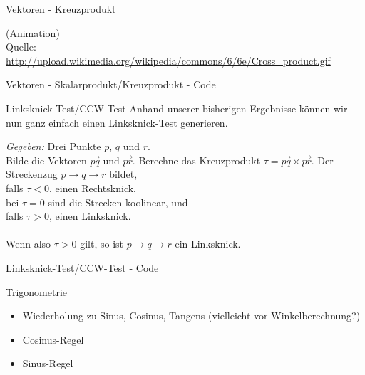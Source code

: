 \begin{frame}{Vektoren - Kreuzprodukt}
	\begin{center}
		(Animation)\\
		Quelle:\\
		\url{http://upload.wikimedia.org/wikipedia/commons/6/6e/Cross_product.gif}
	\end{center}
\end{frame}

\begin{frame}{Vektoren - Skalarprodukt/Kreuzprodukt - Code}
	\lstset{
		language=C++,
		tabsize=1
	}
	
\end{frame}

\begin{frame}{Linksknick-Test/CCW-Test}
	Anhand unserer bisherigen Ergebnisse können wir nun ganz einfach einen Linksknick-Test generieren.
	
	\begin{exampleblock}{}
		\textit{Gegeben:} Drei Punkte $p$, $q$ und $r$.\\
		Bilde die Vektoren $\overrightarrow{pq}$ und $\overrightarrow{pr}$. Berechne das Kreuzprodukt $\tau = \overrightarrow{pq} \times \overrightarrow{pr}$. Der Streckenzug $p \rightarrow q \rightarrow r$ bildet,\\
		falls $\tau < 0$, einen Rechtsknick,\\
		bei $\tau = 0$ sind die Strecken koolinear, und\\
		falls $\tau > 0$, einen Linksknick.\\ \ \\
		
		Wenn also $\tau > 0$ gilt, so ist $p \rightarrow q \rightarrow r$ ein Linksknick.
	\end{exampleblock}
\end{frame}

\begin{frame}{Linksknick-Test/CCW-Test - Code}
	\lstset{
		language=C++,
		tabsize=1
	}
	
\end{frame}

\begin{frame}{Trigonometrie}
	\begin{itemize}
		\item Wiederholung zu Sinus, Cosinus, Tangens (vielleicht vor Winkelberechnung?)
		\item Cosinus-Regel 
		\item Sinus-Regel
	\end{itemize}
\end{frame}